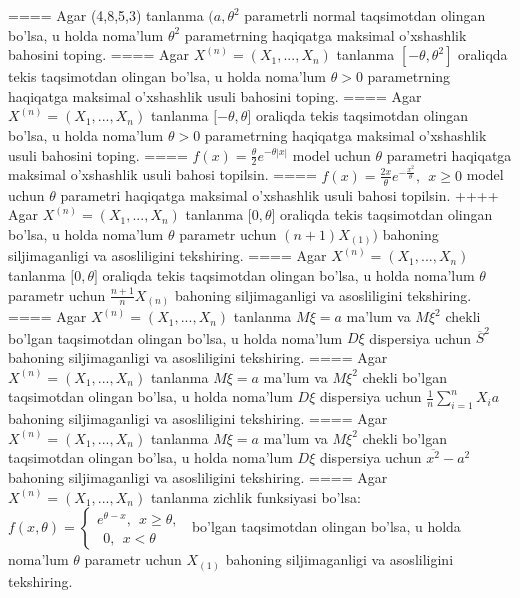 ====
Agar (4,8,5,3) tanlanma \((a,\theta^{2}\) parametrli normal taqsimotdan olingan bo'lsa, u holda noma'lum \(\theta^{2}\) parametrning haqiqatga maksimal o'xshashlik bahosini toping.
====
Agar \(X^{(n)} = \left( X_{1},...,X_{n} \right)\) tanlanma \(\left\lbrack - \theta,\theta^{2} \right\rbrack\) oraliqda tekis taqsimotdan olingan bo'lsa, u holda noma'lum \(\theta > 0\) parametrning haqiqatga maksimal o'xshashlik usuli bahosini toping.
====
Agar \(X^{(n)} = \left( X_{1},...,X_{n} \right)\) tanlanma \(\lbrack - \theta,\theta\rbrack\) oraliqda tekis taqsimotdan olingan bo'lsa, u holda noma'lum \(\theta > 0\) parametrning haqiqatga maksimal o'xshashlik usuli bahosini toping.
====
\(f(x) = \frac{\theta}{2}e^{- \theta|x|}\) model uchun \(\theta\) parametri haqiqatga maksimal o'xshashlik usuli bahosi topilsin.
====
\(f(x) = \frac{2x}{\theta}e^{- \frac{x^{2}}{\theta}},\ \ x \geq 0\) model uchun \(\theta\) parametri haqiqatga maksimal o'xshashlik usuli bahosi topilsin.
++++
Agar \(X^{(n)} = \left( X_{1},...,X_{n} \right)\) tanlanma \(\lbrack 0,\theta\rbrack\) oraliqda tekis taqsimotdan olingan bo'lsa, u holda noma'lum \(\theta\) parametr uchun \((n + 1)X_{(1)})\) bahoning siljimaganligi va asosliligini tekshiring.
====
Agar \(X^{(n)} = \left( X_{1},...,X_{n} \right)\) tanlanma \(\lbrack 0,\theta\rbrack\) oraliqda tekis taqsimotdan olingan bo'lsa, u holda noma'lum \(\theta\) parametr uchun \(\frac{n + 1}{n}X_{(n)}\) bahoning siljimaganligi va asosliligini tekshiring.
====
Agar \(X^{(n)} = \left( X_{1},...,X_{n} \right)\) tanlanma \(M\xi = a\) ma'lum va \(M\xi^{2}\) chekli bo'lgan taqsimotdan olingan bo'lsa, u holda noma'lum \(D\xi\) dispersiya uchun \({\overline{S}}^{2}\) bahoning siljimaganligi va asosliligini tekshiring.
====
Agar \(X^{(n)} = \left( X_{1},...,X_{n} \right)\) tanlanma \(M\xi = a\) ma'lum va \(M\xi^{2}\) chekli bo'lgan taqsimotdan olingan bo'lsa, u holda noma'lum \(D\xi\) dispersiya uchun \(\frac{1}{n}\sum_{i = 1}^{n}{X_{i}a}\) bahoning siljimaganligi va asosliligini tekshiring.
====
Agar \(X^{(n)} = \left( X_{1},...,X_{n} \right)\) tanlanma \(M\xi = a\) ma'lum va \(M\xi^{2}\) chekli bo'lgan taqsimotdan olingan bo'lsa, u holda noma'lum \(D\xi\) dispersiya uchun \(\overline{x^{2}} - a^{2}\) bahoning siljimaganligi va asosliligini tekshiring.
====
Agar \(X^{(n)} = \left( X_{1},...,X_{n} \right)\) tanlanma zichlik funksiyasi bo'lsa: \(f(x,\theta) = \left\{ \begin{matrix}
e^{\theta - x},\ \ x \geq \theta, \\
\ \ 0,\ \ x < \theta
\end{matrix} \right.\ \) bo'lgan taqsimotdan olingan bo'lsa, u holda noma'lum \(\theta\) parametr uchun \(X_{(1)}\) bahoning siljimaganligi va asosliligini tekshiring.

